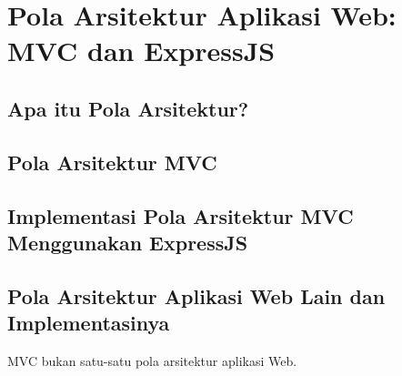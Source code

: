 \chapter{Pola Arsitektur Aplikasi Web: MVC dan ExpressJS}

\section{Apa itu Pola Arsitektur?}

\section{Pola Arsitektur MVC}

\section{Implementasi Pola Arsitektur MVC Menggunakan ExpressJS}

\section{Pola Arsitektur Aplikasi Web Lain dan Implementasinya}

MVC bukan satu-satu pola arsitektur aplikasi Web. 
